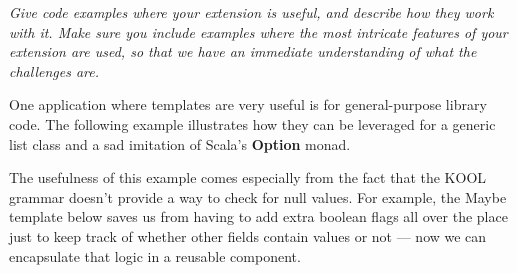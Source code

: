 \emph{Give code examples where your extension is useful, and describe how they work
with it. Make sure you include examples where the most intricate features of
your extension are used, so that we have an immediate understanding of what the
challenges are.}

One application where templates are very useful is for general-purpose library
code. The following example illustrates how they can be leveraged for a generic
list class and a sad imitation of Scala's \textbf{Option} monad.

The usefulness of this example comes especially from the fact that the KOOL
grammar doesn't provide a way to check for null values. For example, the Maybe
template below saves us from having to add extra boolean flags all over the place
just to keep track of whether other fields contain values or not --- now we can
encapsulate that logic in a reusable component.

